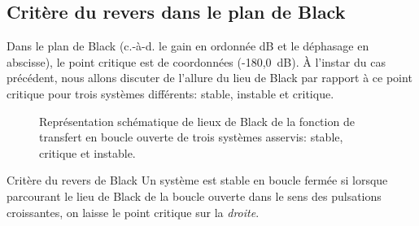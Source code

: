 \subsection{Critère du revers dans le plan de Black
}
Dans le plan de Black (c.-à-d. le gain en ordonnée \si{\dB} et le déphasage
en abscisse), le point critique est de coordonnées (-180\degreeSI,\SI{0}{\dB}).
À l'instar du cas précédent, nous allons discuter de l'allure du lieu de Black
par rapport à ce point critique pour trois systèmes différents:
stable, instable et critique.     
\begin{figure}[!h]
    \centering
    
    \caption{Représentation schématique de lieux de Black de la 
             fonction de transfert en boucle ouverte de trois systèmes 
             asservis: stable, critique et instable.
             \label{fig-black_revers}}
\end{figure}
\begin{criteria}{Critère du revers de Black}
    Un système est stable en boucle fermée si lorsque parcourant 
    le lieu de Black de la boucle ouverte dans le sens des 
    pulsations croissantes, on laisse le point critique sur 
    la \emph{droite}.
\end{criteria}
